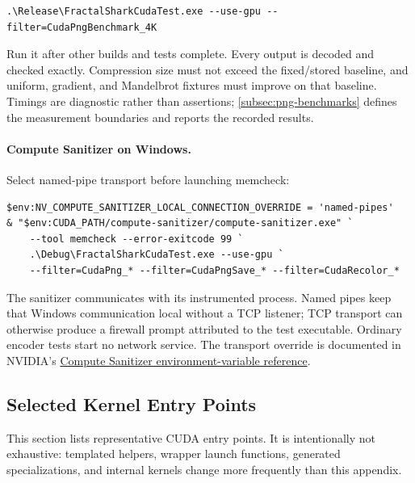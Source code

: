 \begin{lstlisting}[language={},upquote=true]
.\Release\FractalSharkCudaTest.exe --use-gpu --filter=CudaPngBenchmark_4K
\end{lstlisting}

Run it after other builds and tests complete. Every output is decoded
and checked exactly. Compression size must not exceed the fixed/stored
baseline, and uniform, gradient, and Mandelbrot fixtures must improve
on that baseline. Timings are diagnostic rather than assertions;
\cref{subsec:png-benchmarks} defines the measurement boundaries and
reports the recorded results.

\paragraph{Compute Sanitizer on Windows.}
Select named-pipe transport before launching memcheck:

\begin{lstlisting}[language={},upquote=true]
$env:NV_COMPUTE_SANITIZER_LOCAL_CONNECTION_OVERRIDE = 'named-pipes'
& "$env:CUDA_PATH/compute-sanitizer/compute-sanitizer.exe" `
    --tool memcheck --error-exitcode 99 `
    .\Debug\FractalSharkCudaTest.exe --use-gpu `
    --filter=CudaPng_* --filter=CudaPngSave_* --filter=CudaRecolor_*
\end{lstlisting}

The sanitizer communicates with its instrumented process. Named pipes
keep that Windows communication local without a TCP listener; TCP
transport can otherwise produce a firewall prompt attributed to the
test executable. Ordinary encoder tests start no network service.
The transport override is documented in NVIDIA's
\href{https://docs.nvidia.com/compute-sanitizer/ComputeSanitizer/index.html\#environment-variables}
{Compute Sanitizer environment-variable reference}.

\subsection{Selected Kernel Entry Points}
\label{sec:kernel-list}

This section lists representative CUDA entry points.  It is intentionally not
exhaustive: templated helpers, wrapper launch functions, generated
specializations, and internal kernels change more frequently than this appendix.

